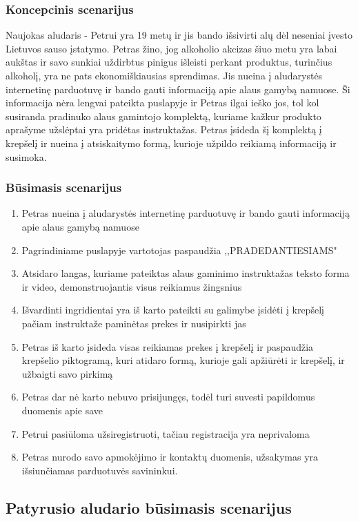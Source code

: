 \documentclass[oneside]{VUMIFPSkursinis}
\begin{document}
		\subsubsection{Koncepcinis scenarijus}
			Naujokas aludaris - Petrui yra 19 metų ir jis bando išsivirti alų dėl neseniai įvesto Lietuvos sauso įstatymo.
			Petras žino, jog alkoholio akcizas šiuo metu yra labai aukštas ir savo sunkiai uždirbtus pinigus išleisti perkant produktus, turinčius alkoholį, yra ne pats ekonomiškiausias sprendimas.
			Jis nueina į aludarystės internetinę parduotuvę ir bando gauti informaciją apie alaus gamybą namuose.
			Ši informacija nėra lengvai pateikta puslapyje ir Petras ilgai ieško jos, tol kol susiranda pradinuko alaus gamintojo komplektą, kuriame kažkur produkto aprašyme užslėptai yra pridėtas instruktažas.
			Petras įsideda šį komplektą į krepšelį ir nueina į atsiskaitymo formą, kurioje užpildo reikiamą informaciją ir susimoka.
		\subsubsection{Būsimasis scenarijus}
			\begin{enumerate}
				\item{Petras nueina į aludarystės internetinę parduotuvę ir bando gauti informaciją apie alaus gamybą namuose}
				\item{Pagrindiniame puslapyje vartotojas paspaudžia ,,PRADEDANTIESIAMS"}
				\item{Atsidaro langas, kuriame pateiktas alaus gaminimo instruktažas teksto forma ir video, demonstruojantis visus reikiamus žingsnius}
				\item{Išvardinti ingridientai yra iš karto pateikti su galimybe įsidėti į krepšelį pačiam instruktaže paminėtas prekes ir nusipirkti jas}
				\item{Petras iš karto įsideda visas reikiamas prekes į krepšelį ir paspaudžia krepšelio piktogramą, kuri atidaro formą, kurioje gali apžiūrėti ir krepšelį, ir užbaigti savo pirkimą}
				\item{Petras dar nė karto nebuvo prisijungęs, todėl turi suvesti papildomus duomenis apie save}
				\item{Petrui pasiūloma užsiregistruoti, tačiau registracija yra neprivaloma}
				\item{Petras nurodo savo apmokėjimo ir kontaktų duomenis, užsakymas yra išsiunčiamas parduotuvės savininkui.}
			\end{enumerate}
	\subsection{Patyrusio aludario būsimasis scenarijus}
\end{document}
